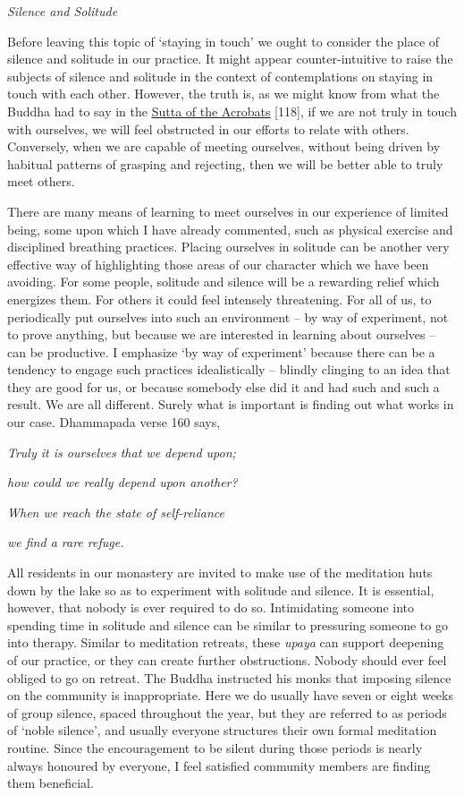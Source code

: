 \emph{Silence and Solitude}

Before leaving this topic of `staying in touch' we ought to consider the
place of silence and solitude in our practice. It might appear
counter-intuitive to raise the subjects of silence and solitude in the
context of contemplations on staying in touch with each other. However,
the truth is, as we might know from what the Buddha had to say in the
\href{https://www.accesstoinsight.org/tipitaka/sn/sn47/sn47.019.olen.html}{\underline{Sutta
of the Acrobats}} {[}118{]}, if we are not truly in touch with
ourselves, we will feel obstructed in our efforts to relate with others.
Conversely, when we are capable of meeting ourselves, without being
driven by habitual patterns of grasping and rejecting, then we will be
better able to truly meet others.

There are many means of learning to meet ourselves in our experience of
limited being, some upon which I have already commented, such as
physical exercise and disciplined breathing practices. Placing ourselves
in solitude can be another very effective way of highlighting those
areas of our character which we have been avoiding. For some people,
solitude and silence will be a rewarding relief which energizes them.
For others it could feel intensely threatening. For all of us, to
periodically put ourselves into such an environment -- by way of
experiment, not to prove anything, but because we are interested in
learning about ourselves -- can be productive. I emphasize `by way of
experiment' because there can be a tendency to engage such practices
idealistically -- blindly clinging to an idea that they are good for us,
or because somebody else did it and had such and such a result. We are
all different. Surely what is important is finding out what works in our
case. Dhammapada verse 160 says,

\emph{Truly it is ourselves that we depend upon;}

\emph{how could we really depend upon another?}

\emph{When we reach the state of self-reliance}

\emph{we find a rare refuge.}

All residents in our monastery are invited to make use of the meditation
huts down by the lake so as to experiment with solitude and silence. It
is essential, however, that nobody is ever required to do so.
Intimidating someone into spending time in solitude and silence can be
similar to pressuring someone to go into therapy. Similar to meditation
retreats, these \emph{upaya} can support deepening of our practice, or
they can create further obstructions. Nobody should ever feel obliged to
go on retreat. The Buddha instructed his monks that imposing silence on
the community is inappropriate. Here we do usually have seven or eight
weeks of group silence, spaced throughout the year, but they are
referred to as periods of `noble silence', and usually everyone
structures their own formal meditation routine. Since the encouragement
to be silent during those periods is nearly always honoured by everyone,
I feel satisfied community members are finding them beneficial.


